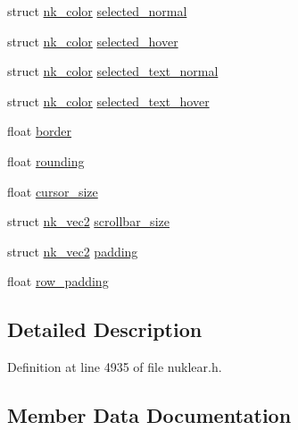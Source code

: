 \begin{DoxyCompactItemize}
\item 
struct \mbox{\hyperlink{structnk__color}{nk\+\_\+color}} \mbox{\hyperlink{structnk__style__edit_a20fc95500c4cf144f1b6f9b4cd82d170}{selected\+\_\+normal}}
\item 
struct \mbox{\hyperlink{structnk__color}{nk\+\_\+color}} \mbox{\hyperlink{structnk__style__edit_a916e3c7beabccf78e513eb08ce223497}{selected\+\_\+hover}}
\item 
struct \mbox{\hyperlink{structnk__color}{nk\+\_\+color}} \mbox{\hyperlink{structnk__style__edit_a9cb16c11781b9eb11ef728df96a67fcb}{selected\+\_\+text\+\_\+normal}}
\item 
struct \mbox{\hyperlink{structnk__color}{nk\+\_\+color}} \mbox{\hyperlink{structnk__style__edit_a5d2d35fa59017d49618c464ffae7b19a}{selected\+\_\+text\+\_\+hover}}
\item 
float \mbox{\hyperlink{structnk__style__edit_a71cb11fe699fb87987b668da7ad09106}{border}}
\item 
float \mbox{\hyperlink{structnk__style__edit_a8ece09a4dd8ad3751b4f8f018b7d031e}{rounding}}
\item 
float \mbox{\hyperlink{structnk__style__edit_a7a07c991e93584f1cc27f93fca73e05d}{cursor\+\_\+size}}
\item 
struct \mbox{\hyperlink{structnk__vec2}{nk\+\_\+vec2}} \mbox{\hyperlink{structnk__style__edit_a901fcfe00eb51d67c95fd00119bd59b8}{scrollbar\+\_\+size}}
\item 
struct \mbox{\hyperlink{structnk__vec2}{nk\+\_\+vec2}} \mbox{\hyperlink{structnk__style__edit_a7dd9e3f6cc5c55b975637efb9633713b}{padding}}
\item 
float \mbox{\hyperlink{structnk__style__edit_ad3e38663299850e384418c2434dc9345}{row\+\_\+padding}}
\end{DoxyCompactItemize}


\subsection{Detailed Description}


Definition at line 4935 of file nuklear.\+h.



\subsection{Member Data Documentation}
\mbox{\label{structnk__style__edit_a084d5d9e1dd1e1c96842b38f9374b5f5}} 
